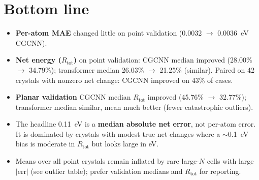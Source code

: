 \documentclass[11pt,a4paper]{article}
\begin{document}
\section*{Bottom line}
\begin{itemize}
  \item \textbf{Per-atom MAE} changed little on point validation (0.0032 $\rightarrow$ 0.0036~eV CGCNN).
  \item \textbf{Net energy ($R_{\mathrm{tot}}$)} on point validation: CGCNN median improved (28.00\% $\rightarrow$ 34.79\%); transformer median 26.03\% $\rightarrow$ 21.25\% (similar). Paired on 42 crystals with nonzero net change: CGCNN improved on 43\% of cases.
  \item \textbf{Planar validation} CGCNN median $R_{\mathrm{tot}}$ improved (45.76\% $\rightarrow$ 32.77\%); transformer median similar, mean much better (fewer catastrophic outliers).
  \item The headline 0.11~eV is a \textbf{median absolute net error}, not per-atom error. It is dominated by crystals with modest true net changes where a $\sim$0.1~eV bias is moderate in $R_{\mathrm{tot}}$ but looks large in eV.
  \item Means over all point crystals remain inflated by rare large-$N$ cells with large $|\mathrm{err}|$ (see outlier table); prefer validation medians and $R_{\mathrm{tot}}$ for reporting.
\end{itemize}
\end{document}
